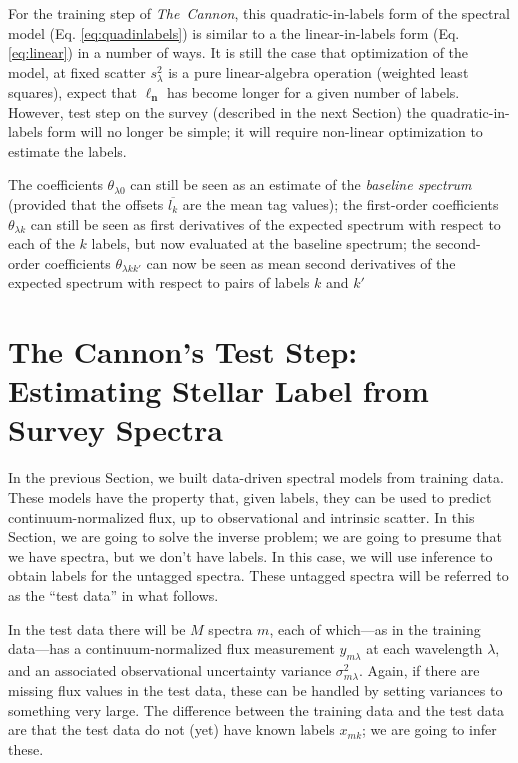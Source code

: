 \documentclass[12pt, preprint]{aastex}
\newcommand{\sectionname}{Section}
\newcommand{\set}[1]{\bm{#1}}
\newcommand{\mean}[1]{\overline{#1}}
\newcommand{\tc}{\textsl{The~Cannon}}
\begin{document}
For the training step of \tc , this quadratic-in-labels form  of the spectral model (Eq. \ref{eq:quadinlabels}) is similar to a the linear-in-labels form (Eq. \ref{eq:linear}) in a number
of ways.
It is still the case that optimization of the model, at fixed scatter
$s_\lambda^2$ is a pure linear-algebra operation (weighted least
squares), expect that $\set{\ell_n}$ has become longer for a given number of labels. 
However, test step on the survey (described in the next Section) the quadratic-in-labels form
 will no longer be simple; it will require non-linear
optimization to estimate the labels.

The coefficients $\theta_{\lambda 0}$ can still be seen as an estimate of the
\emph{baseline spectrum} (provided that the offsets $\mean{l_k}$ are the
mean tag values); the first-order coefficients $\theta_{\lambda k}$ can still
be seen as first derivatives of the expected spectrum with respect to
each of the $k$ labels, but now evaluated at the baseline spectrum; the
second-order coefficients $\theta_{\lambda kk'}$ can now be seen as mean
second derivatives of the expected spectrum with respect to pairs of
labels $k$ and $k'$

\section{The Cannon's Test Step: Estimating Stellar Label from Survey Spectra}
\label{sec:paramestimate}

In the previous \sectionname, we built data-driven spectral models
from training data.
These models have the property that, given labels, they can be used to
predict continuum-normalized flux, up to observational and intrinsic
scatter.
In this \sectionname, we are going to solve the inverse problem; we
are going to presume that we have spectra, but we don't have labels.
In this case, we will use inference to obtain labels for the untagged
spectra.
These untagged spectra will be referred to as the ``test data'' in
what follows.

In the test data there will be $M$ spectra $m$, each of which---as in
the training data---has a continuum-normalized flux measurement
$y_{m\lambda}$ at each wavelength $\lambda$, and an
associated observational uncertainty variance $\sigma_{m\lambda}^2$.
Again, if there are missing flux values in the test data, these can be
handled by setting variances to something very large.
The difference between the training data and the test data are that the
test data do not (yet) have known labels $x_{mk}$; we are going to infer
these.
\end{document}
